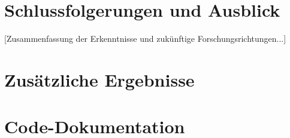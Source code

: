 \documentclass[12pt,twoside,openright]{scrreprt}
\theoremstyle{definition}
\theoremstyle{plain}
\begin{document}
\chapter{Schlussfolgerungen und Ausblick}
\label{ch:conclusions}

[Zusammenfassung der Erkenntnisse und zukünftige Forschungsrichtungen...]

\appendix
\chapter{Zusätzliche Ergebnisse}
\label{app:additional}

\chapter{Code-Dokumentation}
\label{app:code}

\printbibliography
\end{document}
